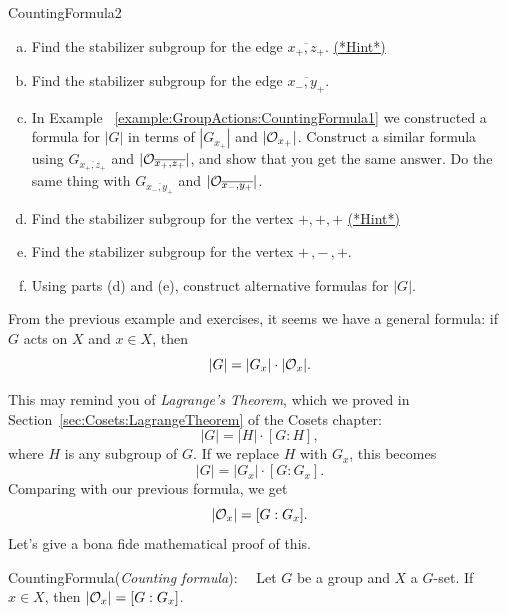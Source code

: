 \begin{exercise}{CountingFormula2}
\begin{enumerate}[(a)]
\item Find the stabilizer subgroup for the edge $\overline{x_+,z_+}$. 
\hyperref[sec:GroupActions:Hints]{(*Hint*)}
\item Find the stabilizer subgroup for the edge $\overline{x_-,y_+}$.
\item In Example ~\ref{example:GroupActions:CountingFormula1} we constructed a formula for $|G|$ in terms of $| G_{x_+}|$ and $|{\cal O}_{x_+}|$.  Construct a similar formula using $G_{\overline{x_+,z_+}}$ and $|{\cal O}_{\overline{x_+,z_+}}|$, and show that you get the same answer. Do the same thing with $G_{\overline{x_-,y_+}}$ and $|{\cal O}_{\overline{x_-,y_+}}|$.  
\item Find the stabilizer subgroup for the vertex $+,+,+$ 
\hyperref[sec:GroupActions:Hints]{(*Hint*)}
\item Find the stabilizer subgroup for the vertex $+\,,-\,,+$. 
\item Using parts (d) and (e), construct alternative formulas for $|G|$.
\end{enumerate}
\end{exercise}

From the previous example and exercises, it seems we have a general formula:  if $G$ acts on $X$ and $x\in X$, then 
$$|G|=|G_x|\cdot|{\cal O}_x|.$$

This may remind you of \emph{Lagrange's Theorem}, which we proved in Section~\ref{sec:Cosets:LagrangeTheorem} of the Cosets chapter:  
$$|G|=|H|\cdot [G:H], $$
where $H$ is any subgroup of $G$.  If we replace $H$ with $G_x$, this becomes $$|G|=|G_x|\cdot [G:G_x]. $$
Comparing with our previous formula, we get
 $$|{\cal O}_x|=[G:G_x].$$
Let's give a bona fide mathematical proof of this.

\begin{prop}{CountingFormula}(\emph{Counting formula}):~~
Let $G$ be a group and $X$ a $G$-set. If $x\in X$,
then $|{\cal O}_x| = [G:G_x]$. 
\end{prop}

